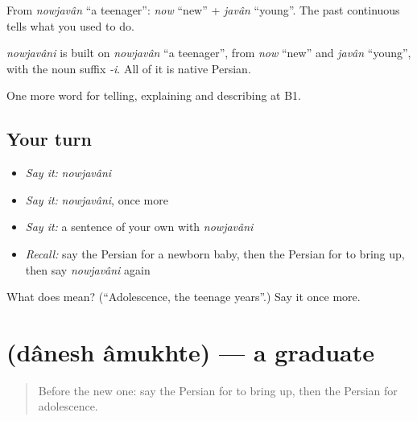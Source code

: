 From \emph{nowjavân} \textquotedblleft{}a teenager\textquotedblright{}: \emph{now} \textquotedblleft{}new\textquotedblright{} + \emph{javân} \textquotedblleft{}young\textquotedblright{}. The past continuous tells what you used to do.

\begin{cousinweb}
\emph{nowjavâni} is built on \emph{nowjavân} \textquotedblleft{}a teenager\textquotedblright{}, from \emph{now} \textquotedblleft{}new\textquotedblright{} and \emph{javân} \textquotedblleft{}young\textquotedblright{}, with the noun suffix \emph{-i}. All of it is native Persian.
\end{cousinweb}

\begin{grammarlens}[title={What you've built}]
One more word for telling, explaining and describing at B1.
\end{grammarlens}

\subsection*{Your turn}
\begin{itemize}
\raggedright
  \item \emph{Say it:} \emph{nowjavâni}
  \item \emph{Say it:} \emph{nowjavâni}, once more
  \item \emph{Say it:} a sentence of your own with \emph{nowjavâni}
  \item \emph{Recall:} say the Persian for a newborn baby, then the Persian for to bring up, then say \emph{nowjavâni} again
\end{itemize}

\begin{tcolorbox}[breakable,colback=teal!4,colframe=teal!35!black,title={Before you move on}]
What does  mean? (\textquotedblleft{}Adolescence, the teenage years\textquotedblright{}.) Say it once more.
\end{tcolorbox}
\section[\texorpdfstring{\fa{دانش} \fa{آموخته} (dânesh âmukhte)}{دانش آموخته (dânesh âmukhte)}]{  (dânesh âmukhte) — a graduate}

\label{lesson:FA-C333-danesh-amukhte}



\begin{quote}
Before the new one: say the Persian for to bring up, then the Persian for adolescence.
\end{quote}

